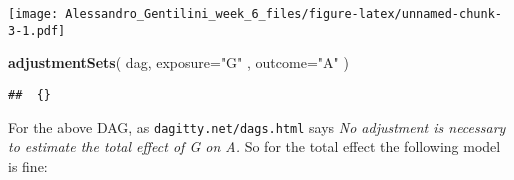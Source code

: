 \documentclass[]{article}
\newenvironment{Shaded}{\begin{snugshade}}{\end{snugshade}}
\newcommand{\KeywordTok}[1]{\textcolor[rgb]{0.13,0.29,0.53}{\textbf{{#1}}}}
\newcommand{\DataTypeTok}[1]{\textcolor[rgb]{0.13,0.29,0.53}{{#1}}}
\newcommand{\DecValTok}[1]{\textcolor[rgb]{0.00,0.00,0.81}{{#1}}}
\newcommand{\FloatTok}[1]{\textcolor[rgb]{0.00,0.00,0.81}{{#1}}}
\newcommand{\StringTok}[1]{\textcolor[rgb]{0.31,0.60,0.02}{{#1}}}
\newcommand{\NormalTok}[1]{{#1}}
\begin{document}
\texttt{[image: Alessandro\_Gentilini\_week\_6\_files/figure-latex/unnamed-chunk-3-1.pdf]}

\begin{Shaded}
\begin{Highlighting}[]
\KeywordTok{adjustmentSets}\NormalTok{( dag, }\DataTypeTok{exposure=}\StringTok{"G"} \NormalTok{, }\DataTypeTok{outcome=}\StringTok{"A"} \NormalTok{)}
\end{Highlighting}
\end{Shaded}

\begin{verbatim}
##  {}
\end{verbatim}

For the above DAG, as \texttt{dagitty.net/dags.html} says \emph{No
adjustment is necessary to estimate the total effect of G on A.} So for
the total effect the following model is fine:

\begin{Shaded}
\end{Shaded}
\end{document}
